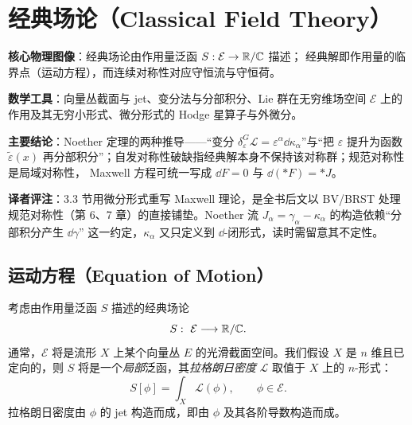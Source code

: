 
\section{经典场论（Classical Field Theory）}

\begin{keypoints}
  \item \textbf{核心物理图像}：经典场论由作用量泛函 $S:\mathcal{E}\to\mathbb{R}/\mathbb{C}$ 描述；
        经典解即作用量的临界点（运动方程），而连续对称性对应守恒流与守恒荷。
  \item \textbf{数学工具}：向量丛截面与 jet、变分法与分部积分、Lie 群在无穷维场空间
        $\mathcal{E}$ 上的作用及其无穷小形式、微分形式的 Hodge 星算子与外微分。
  \item \textbf{主要结论}：Noether 定理的两种推导——“变分 $\delta^G_\varepsilon\mathcal{L}
        =\varepsilon^\alpha\dd\kappa_\alpha$”与“把 $\varepsilon$ 提升为函数 $\tilde\varepsilon(x)$
        再分部积分”；自发对称性破缺指经典解本身不保持该对称群；规范对称性是局域对称性，
        Maxwell 方程可统一写成 $\dd F=0$ 与 $\dd({*}F)={*}J$。
  \item \textbf{译者评注}：3.3 节用微分形式重写 Maxwell 理论，是全书后文以 BV/BRST
        处理规范对称性（第 6、7 章）的直接铺垫。Noether 流
        $J_\alpha=\gamma_\alpha-\kappa_\alpha$ 的构造依赖“分部积分产生 $\dd\gamma$”
        这一约定，$\kappa_\alpha$ 又只定义到 $\dd$-闭形式，读时需留意其不定性。
\end{keypoints}

\subsection{运动方程（Equation of Motion）}

考虑由作用量泛函 $S$ 描述的经典场论
\[
  S:\ \mathcal{E}\longrightarrow\R/\C.
\]
通常，$\mathcal{E}$ 将是流形 $X$ 上某个向量丛 $E$ 的光滑截面空间。我们假设 $X$ 是
$n$ 维且已定向的，则 $S$ 将是一个\emph{局部}泛函，其\emph{拉格朗日密度}
$\mathcal{L}$ 取值于 $X$ 上的 $n$-形式：
\[
  S[\phi]=\int_{X}\mathcal{L}(\phi),\qquad \phi\in\mathcal{E}.
\]
拉格朗日密度由 $\phi$ 的 jet 构造而成，即由 $\phi$ 及其各阶导数构造而成。


